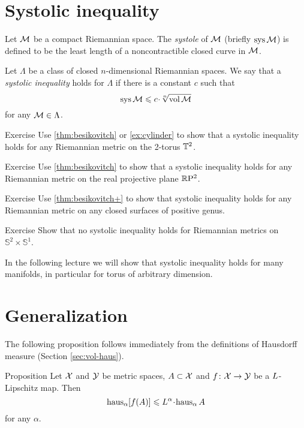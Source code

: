 \section{Systolic inequality}

Let $\mathcal{M}$ be a compact Riemannian space.
The \emph{systole} of $\mathcal{M}$ (briefly $\mathop{\rm sys}\nolimits\mathcal{M}$) is defined to be the least length of a noncontractible closed curve in $\mathcal{M}$.

Let $\Lambda$ be a class of closed $n$-dimensional Riemannian spaces.
We say that a \emph{systolic inequality} holds for $\Lambda$ if there is a constant $c$ such that 
\[\sys\spc{M}\le c\cdot \sqrt[n]{\vol\spc{M}}\]
for any $\mathcal{M}\in \Lambda$.

\begin{thm}{Exercise}\label{ex:sysT2}
Use \ref{thm:besikovitch} or \ref{ex:cylinder} to show that a systolic inequality holds for any Riemannian metric on the 2-torus $\mathbb{T}^2$.
\end{thm}

\begin{thm}{Exercise}\label{ex:sysRP2}
Use \ref{thm:besikovitch} to show that a systolic inequality holds for any Riemannian metric on  the real projective plane $\mathbb{R}\mathrm{P}^2$.
\end{thm}

\begin{thm}{Exercise}\label{ex:sysSg}
Use \ref{thm:besikovitch+} to show that systolic inequality holds for any Riemannian metric on any closed surfaces of positive genus.
\end{thm}

\begin{thm}{Exercise}\label{ex:sysS2xS1}
Show that no systolic inequality holds for Riemannian metrics on $\mathbb{S}^2\times\mathbb{S}^1$.
\end{thm}

In the following lecture we will show that systolic inequality holds for many manifolds, in particular for torus of arbitrary dimension.

\section{Generalization}\label{sec:hausdorff-measure}

The following proposition follows immediately from the definitions of Hausdorff measure (Section \ref{sec:vol-haus}).

\begin{thm}{Proposition}\label{prop:bilip-measure}
Let $\mathcal{X}$ and $\mathcal{Y}$ be metric spaces, $A\subset \mathcal{X}$
and
 $f\colon \mathcal{X}\to \mathcal{Y}$ be a $L$-Lipschitz map. 
Then 
\[\haus_\alpha [f(A)]\le \Lip^\alpha\cdot\haus_\alpha\, A\]
for any $\alpha$.
\end{thm}

